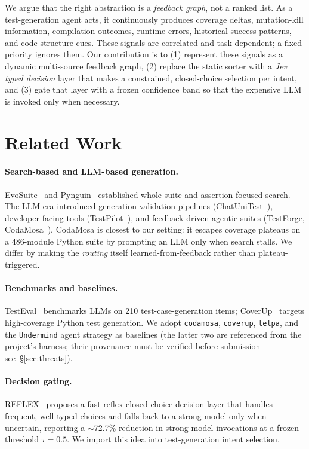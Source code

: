\documentclass[11pt]{article}
\begin{document}
We argue that the right abstraction is a \emph{feedback graph}, not a ranked list. As a test-generation agent acts, it continuously produces coverage deltas, mutation-kill information, compilation outcomes, runtime errors, historical success patterns, and code-structure cues. These signals are correlated and task-dependent; a fixed priority ignores them. Our contribution is to (1) represent these signals as a dynamic multi-source feedback graph, (2) replace the static sorter with a \emph{Jev typed decision} layer that makes a constrained, closed-choice selection per intent, and (3) gate that layer with a frozen confidence band so that the expensive LLM is invoked only when necessary.

\section{Related Work}
\paragraph{Search-based and LLM-based generation.}
EvoSuite~\cite{evosuite} and Pynguin~\cite{pynguin} established whole-suite and assertion-focused search. The LLM era introduced generation-validation pipelines (ChatUniTest~\cite{chatunitest}), developer-facing tools (TestPilot~\cite{testpilot}), and feedback-driven agentic suites (TestForge, CodaMosa~\cite{codamosa}). CodaMosa is closest to our setting: it escapes coverage plateaus on a 486-module Python suite by prompting an LLM only when search stalls. We differ by making the \emph{routing} itself learned-from-feedback rather than plateau-triggered.
\paragraph{Benchmarks and baselines.}
TestEval~\cite{testeval} benchmarks LLMs on 210 test-case-generation items; CoverUp~\cite{coverup} targets high-coverage Python test generation. We adopt \texttt{codamosa}, \texttt{coverup}, \texttt{telpa}, and the \texttt{Undermind} agent strategy as baselines (the latter two are referenced from the project's harness; their provenance must be verified before submission -- see~\S\ref{sec:threats}).
\paragraph{Decision gating.}
REFLEX~\cite{reflex} proposes a fast-reflex closed-choice decision layer that handles frequent, well-typed choices and falls back to a strong model only when uncertain, reporting a $\sim$72.7\% reduction in strong-model invocations at a frozen threshold $\tau=0.5$. We import this idea into test-generation intent selection.
\end{document}
